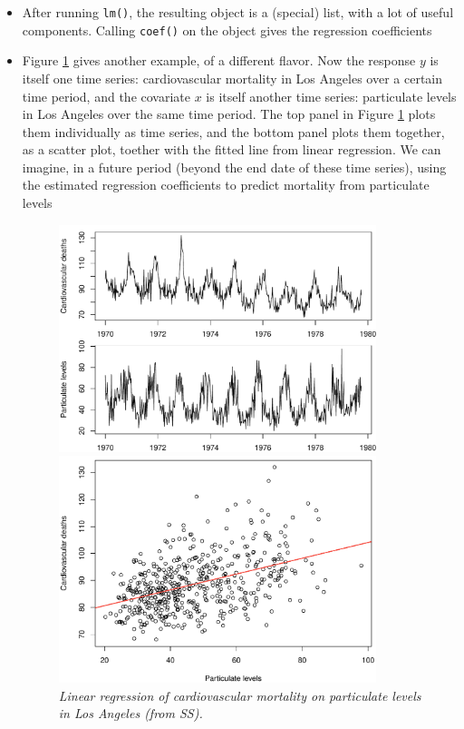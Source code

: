 \documentclass{article}
\begin{document}
\begin{itemize}
\item After running \verb|lm()|, the resulting object is a (special) list, with
  a lot of useful  components. Calling \verb|coef()| on the object gives the
  regression coefficients   

\item Figure \ref{fig:cardio} gives another example, of a different flavor. Now
  the response $y$ is itself one time series: cardiovascular mortality in Los
  Angeles over a certain time period, and the covariate $x$ is itself another
  time series: particulate levels in Los Angeles over the same time period. The 
  top panel in Figure \ref{fig:cardio} plots them individually as time series,
  and the bottom panel plots them together, as a scatter plot, toether with the
  fitted line from linear regression. We can imagine, in a future period (beyond
  the end date of these time series), using the estimated regression
  coefficients to predict mortality from particulate levels  

\begin{figure}[p]
\centering
\includegraphics[width=0.875\textwidth]{fig/cardio-1.pdf} 

\bigskip\bigskip
\includegraphics[width=0.875\textwidth]{fig/cardio-2.pdf}

\caption{\it Linear regression of cardiovascular mortality on particulate levels 
  in Los Angeles (from SS).} 
\label{fig:cardio}
\end{figure}
\end{itemize}
\end{document}
